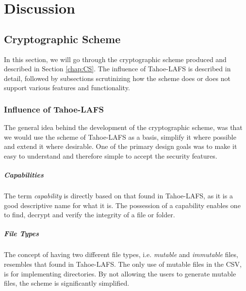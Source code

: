 \documentclass[pdftex,english,10pt,b5paper,twoside]{book}
\begin{document}
\chapter{Discussion}
\label{ch:discussion}


\section{Cryptographic Scheme}

In this section, we will go through the cryptographic scheme produced and
described in Section \ref{chap:CS}. The influence of Tahoe-\ac{LAFS} is
described in detail, followed by subsections scrutinizing how the scheme does
or does not support various features and functionality.

\subsection{Influence of Tahoe-LAFS}

The general idea behind the development of the cryptographic scheme, was that
we would use the scheme of Tahoe-\ac{LAFS} as a basis, simplify it where
possible and extend it where desirable. One of the primary design goals was to
make it easy to understand and therefore simple to accept the security
features.

\paragraph{Capabilities} The term \emph{capability} is directly based on that
found in Tahoe-\ac{LAFS}, as it is a good descriptive name for what it is. The
possession of a capability enables one to find, decrypt and verify the
integrity of a file or folder.

\paragraph{File Types} The concept of having two different file types, i.e.
\emph{mutable} and \emph{immutable} files, resembles that found in
Tahoe-\ac{LAFS}. The only use of mutable files in the \acl{CSV}, is for
implementing directories. By not allowing the users to generate mutable files,
the scheme is significantly simplified.
\end{document}
